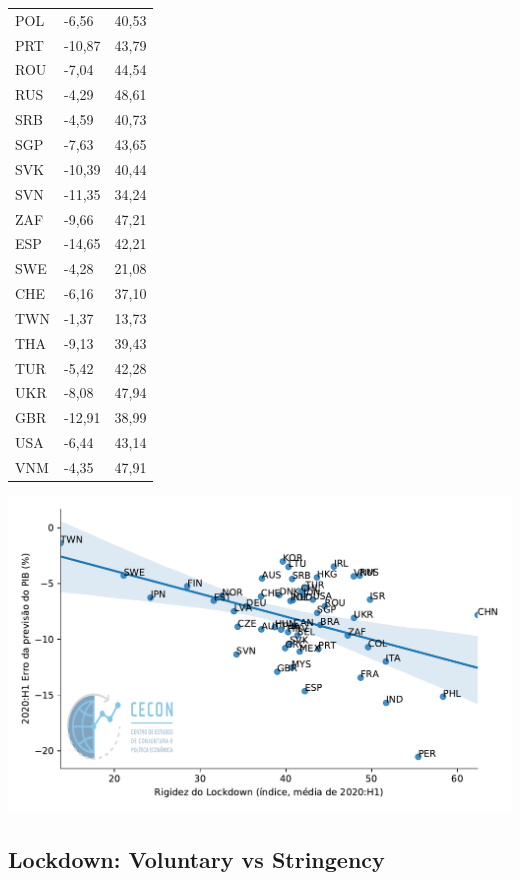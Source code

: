 \documentclass{SelfArx}
\begin{document}
\begin{table}[htbp]
\begin{tabular}{lll}
POL & -6,56 & 40,53\\
PRT & -10,87 & 43,79\\
ROU & -7,04 & 44,54\\
RUS & -4,29 & 48,61\\
SRB & -4,59 & 40,73\\
SGP & -7,63 & 43,65\\
SVK & -10,39 & 40,44\\
SVN & -11,35 & 34,24\\
ZAF & -9,66 & 47,21\\
ESP & -14,65 & 42,21\\
SWE & -4,28 & 21,08\\
CHE & -6,16 & 37,10\\
TWN & -1,37 & 13,73\\
THA & -9,13 & 39,43\\
TUR & -5,42 & 42,28\\
UKR & -8,08 & 47,94\\
GBR & -12,91 & 38,99\\
USA & -6,44 & 43,14\\
VNM & -4,35 & 47,91\\
\hline
\end{tabular}
\end{table}
\begin{center}
\includegraphics[width=.9\linewidth]{./figs/IMF/GDP_Lockdown.pdf}
\end{center}



\subsection*{Lockdown: Voluntary vs Stringency}
\label{sec:orga9fb135}
\end{document}
